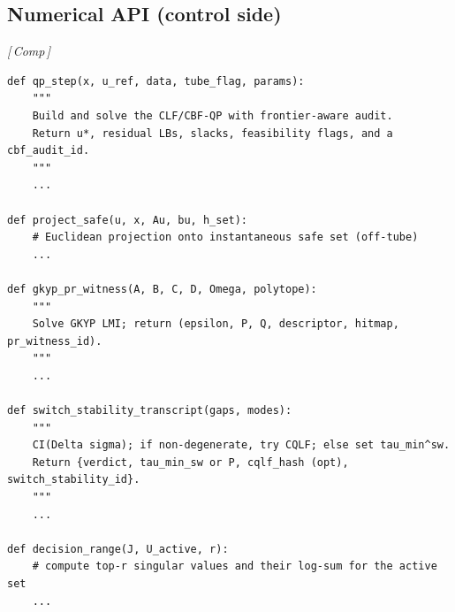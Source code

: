 \documentclass[10pt]{article}
\newcommand{\layertag}[1]{\textsf{\footnotesize[\,#1\,]}}
\begin{document}
\subsection{Numerical API (control side)}\label{subsec:api-ctrl}
\emph{\layertag{Comp}}
\begin{lstlisting}
def qp_step(x, u_ref, data, tube_flag, params):
    """
    Build and solve the CLF/CBF-QP with frontier-aware audit.
    Return u*, residual LBs, slacks, feasibility flags, and a cbf_audit_id.
    """
    ...

def project_safe(u, x, Au, bu, h_set):
    # Euclidean projection onto instantaneous safe set (off-tube)
    ...

def gkyp_pr_witness(A, B, C, D, Omega, polytope):
    """
    Solve GKYP LMI; return (epsilon, P, Q, descriptor, hitmap, pr_witness_id).
    """
    ...

def switch_stability_transcript(gaps, modes):
    """
    CI(Delta sigma); if non-degenerate, try CQLF; else set tau_min^sw.
    Return {verdict, tau_min_sw or P, cqlf_hash (opt), switch_stability_id}.
    """
    ...

def decision_range(J, U_active, r):
    # compute top-r singular values and their log-sum for the active set
    ...
\end{lstlisting}
\end{document}
